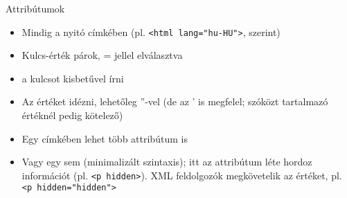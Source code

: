 \begin{frame}
  Attribútumok
  \begin{itemize}
    \item Mindig a nyitó címkében (pl. \texttt{<html lang="hu-HU">},  szerint)
    \item Kulcs-érték párok, = jellel elválasztva
    \item {} a kulcsot kisbetűvel írni
    \item Az értéket  idézni, lehetőleg ''-vel (de az ' is megfelel; szóközt tartalmazó értéknél pedig kötelező)
    \item Egy címkében lehet több attribútum is
    \item Vagy egy sem (minimalizált szintaxis); itt az attribútum léte hordoz információt (pl. \texttt{<p hidden>}). XML feldolgozók megkövetelik az értéket, pl. \texttt{<p~hidden="hidden">}
  \end{itemize}
\end{frame}

